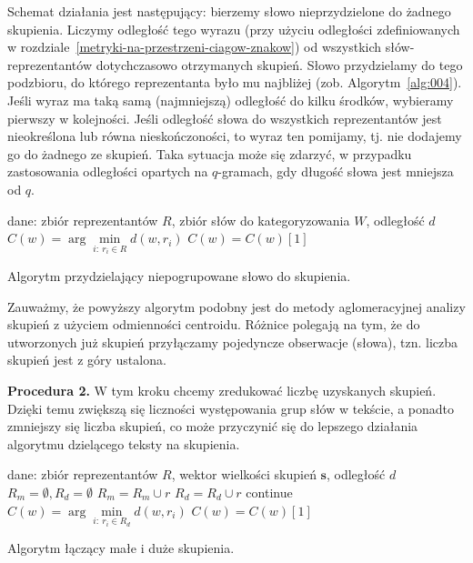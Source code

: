 \documentclass{praca1}
\begin{document}
Schemat działania jest następujący: bierzemy słowo nieprzydzielone do żadnego skupienia. Liczymy odległość tego wyrazu (przy użyciu odległości zdefiniowanych w rozdziale~\ref{metryki-na-przestrzeni-ciagow-znakow}) od wszystkich słów-reprezentantów dotychczasowo otrzymanych skupień. Słowo przydzielamy do tego podzbioru, do którego reprezentanta było mu najbliżej (zob. Algorytm~\ref{alg:004}). Jeśli wyraz ma taką samą (najmniejszą) odległość do kilku środków, wybieramy pierwszy w kolejności. Jeśli odległość słowa do wszystkich reprezentantów jest nieokreślona lub równa nieskończoności, to wyraz ten pomijamy, tj. nie dodajemy go do żadnego ze skupień. Taka sytuacja może się zdarzyć, w przypadku zastosowania odległości opartych na $q$-gramach, gdy długość słowa jest mniejsza od $q$.


\begin{algorithm}[h!]
\begin{algorithmic}[1]
		\State dane: zbiór reprezentantów $R$, zbiór słów do kategoryzowania $W$, odległość $d$
            \State $C(w) = \arg \min\limits_{i:\ r_i \in R} d(w,r_i)$
            	\State $C(w) = C(w)[1]$
            \EndIf
       \EndFor
\end{algorithmic}
\caption{Algorytm przydzielający niepogrupowane słowo do skupienia.}\label{alg:004}
\end{algorithm}

Zauważmy, że powyższy algorytm podobny jest do metody aglomeracyjnej analizy skupień z użyciem odmienności centroidu. Różnice polegają na tym, że do utworzonych już skupień przyłączamy pojedyncze obserwacje (słowa), tzn. liczba skupień jest z góry ustalona.

\textbf{Procedura 2.} W tym kroku chcemy zredukować liczbę uzyskanych skupień. Dzięki temu zwiększą się liczności występowania grup słów w tekście, a ponadto zmniejszy się liczba skupień, co może przyczynić się do lepszego działania algorytmu dzielącego teksty na skupienia.

\begin{algorithm}[h!]
\begin{algorithmic}[1]
		\State dane: zbiór reprezentantów $R$, wektor wielkości skupień $\mathbf{s}$, odległość $d$
		\State $R_m = \emptyset, R_d = \emptyset$
				\State $R_m = R_m \cup r$
			\Else
				\State $R_d = R_d \cup r$
			\EndIf
		\EndFor
        		\State continue
        	\EndIf
            \State $C(w) = \arg\min\limits_{i:\ r_i \in R_d} d(w,r_i)$
            	\State $C(w) = C(w)[1]$
            \EndIf
       \EndFor
\end{algorithmic}
\caption{Algorytm łączący małe i duże skupienia.}\label{alg:005}
\end{algorithm}
\end{document}
